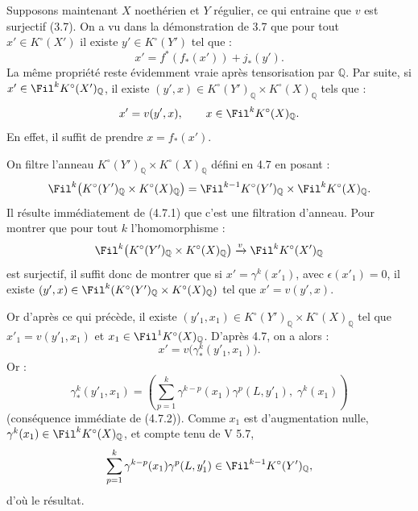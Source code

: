 Supposons maintenant \(X\) noethérien et \(Y\) régulier, ce qui entraine que \(v\) est surjectif (3.7). On a vu dans la démonstration de 3.7 que pour tout \(x'\in K^\circ(X')\) il existe \(y'\in K^\circ(Y')\) tel que :
\[
  x'=f^*(f_*(x'))+j_*(y').
\]
La même propriété reste évidemment vraie après tensorisation par \(\mathbb Q\). Par suite, si \(x'\in\Fil^kK^\circ(X')_{\mathbb Q}\), il existe \((y',x)\in K^\circ(Y')_{\mathbb Q}\times K^\circ(X)_{\mathbb Q}\) tels que :
\[
  x'=v(y',x),\qquad x\in\Fil^kK^\circ(X)_{\mathbb Q}.
\]
En effet, il suffit de prendre \(x=f_*(x')\).

On filtre l'anneau \(K^\circ(Y')_{\mathbb Q}\times K^\circ(X)_{\mathbb Q}\) défini en 4.7 en posant :
\[
  \Fil^k\bigl(K^\circ(Y')_{\mathbb Q}\times K^\circ(X)_{\mathbb Q}\bigr)
  =
  \Fil^{k-1}K^\circ(Y')_{\mathbb Q}\times \Fil^kK^\circ(X)_{\mathbb Q}.
\]
Il résulte immédiatement de (4.7.1) que c'est une filtration d'anneau. Pour montrer que pour tout \(k\) l'homomorphisme :
\[
  \Fil^k\bigl(K^\circ(Y')_{\mathbb Q}\times K^\circ(X)_{\mathbb Q}\bigr)
  \xrightarrow{v}
  \Fil^kK^\circ(X')_{\mathbb Q}
\]
est surjectif, il suffit donc de montrer que si \(x'= \gamma^k(x'_1)\), avec \(\epsilon(x'_1)=0\), il existe \((y',x)\in\Fil^k(K^\circ(Y')_{\mathbb Q}\times K^\circ(X)_{\mathbb Q})\) tel que \(x'=v(y',x)\).

Or d'après ce qui précède, il existe \((y'_1,x_1)\in K^\circ(Y')_{\mathbb Q}\times K^\circ(X)_{\mathbb Q}\) tel que \(x'_1=v(y'_1,x_1)\) et \(x_1\in\Fil^1K^\circ(X)_{\mathbb Q}\). D'après 4.7, on a alors :
\[
  x'=v\bigl(\gamma^k_*(y'_1,x_1)\bigr).
\]
Or :
\[
  \gamma^k_*(y'_1,x_1)
  =
  \left(\sum_{p=1}^{k}\gamma^{k-p}(x_1)\gamma^p(L,y'_1),\;
  \gamma^k(x_1)\right)
\]
(conséquence immédiate de (4.7.2)). Comme \(x_1\) est d'augmentation nulle, \(\gamma^k(x_1)\in\Fil^kK^\circ(X)_{\mathbb Q}\), et compte tenu de V 5.7,
\[
  \sum_{p=1}^{k}\gamma^{k-p}(x_1)\gamma^p(L,y'_1)
  \in\Fil^{k-1}K^\circ(Y')_{\mathbb Q},
\]
d'où le résultat.

